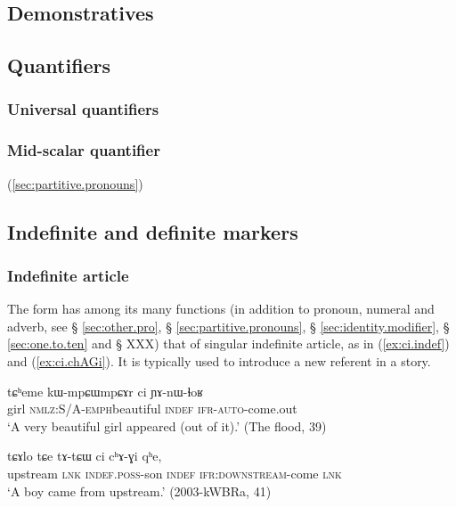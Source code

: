 \subsection{Demonstratives} \label{sec:demonstrative.determiners}

\subsection{Quantifiers}
\subsubsection{Universal quantifiers} \label{sec:universal.quant}
\subsubsection{Mid-scalar quantifier} \label{sec:tsuku}
(\ref{sec:partitive.pronouns})

\subsection{Indefinite and definite markers} \label{sec:indefinite.markers}

\subsubsection{Indefinite article} \label{sec:indef.article}
The form  has among its many functions (in addition to pronoun, numeral and adverb, see § \ref{sec:other.pro}, § \ref{sec:partitive.pronouns}, § \ref{sec:identity.modifier}, § \ref{sec:one.to.ten} and § XXX) that of singular indefinite article, as in (\ref{ex:ci.indef}) and (\ref{ex:ci.chAGi}). It is typically used to introduce a new referent in a story.

\begin{exe}
\ex \label{ex:ci.indef}
\gll tɕʰeme kɯ-mpɕɯ\redp{}mpɕɤr ci ɲɤ-nɯ-ɬoʁ \\
girl \textsc{nmlz}:S/A-\textsc{emph}\redp{}beautiful \textsc{indef} \textsc{ifr}-\textsc{auto}-come.out \\
\glt `A very beautiful girl appeared (out of it).' (The flood, 39)
\end{exe}

\begin{exe}
\ex \label{ex:ci.chAGi}
\gll tɕɤlo tɕe tɤ-tɕɯ ci cʰɤ-ɣi qʰe, \\
upstream \textsc{lnk} \textsc{indef}.\textsc{poss}-son \textsc{indef} \textsc{ifr}:\textsc{downstream}-come \textsc{lnk} \\
\glt `A boy came from upstream.' (2003-kWBRa, 41)
\end{exe}

